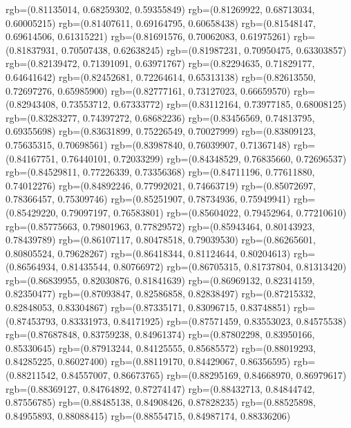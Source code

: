 {{        rgb=(0.81135014, 0.68259302, 0.59355849)
        rgb=(0.81269922, 0.68713034, 0.60005215)
        rgb=(0.81407611, 0.69164795, 0.60658438)
        rgb=(0.81548147, 0.69614506, 0.61315221)
        rgb=(0.81691576, 0.70062083, 0.61975261)
        rgb=(0.81837931, 0.70507438, 0.62638245)
        rgb=(0.81987231, 0.70950475, 0.63303857)
        rgb=(0.82139472, 0.71391091, 0.63971767)
        rgb=(0.82294635, 0.71829177, 0.64641642)
        rgb=(0.82452681, 0.72264614, 0.65313138)
        rgb=(0.82613550, 0.72697276, 0.65985900)
        rgb=(0.82777161, 0.73127023, 0.66659570)
        rgb=(0.82943408, 0.73553712, 0.67333772)
        rgb=(0.83112164, 0.73977185, 0.68008125)
        rgb=(0.83283277, 0.74397272, 0.68682236)
        rgb=(0.83456569, 0.74813795, 0.69355698)
        rgb=(0.83631899, 0.75226549, 0.70027999)
        rgb=(0.83809123, 0.75635315, 0.70698561)
        rgb=(0.83987840, 0.76039907, 0.71367148)
        rgb=(0.84167751, 0.76440101, 0.72033299)
        rgb=(0.84348529, 0.76835660, 0.72696537)
        rgb=(0.84529811, 0.77226339, 0.73356368)
        rgb=(0.84711196, 0.77611880, 0.74012276)
        rgb=(0.84892246, 0.77992021, 0.74663719)
        rgb=(0.85072697, 0.78366457, 0.75309746)
        rgb=(0.85251907, 0.78734936, 0.75949941)
        rgb=(0.85429220, 0.79097197, 0.76583801)
        rgb=(0.85604022, 0.79452964, 0.77210610)
        rgb=(0.85775663, 0.79801963, 0.77829572)
        rgb=(0.85943464, 0.80143923, 0.78439789)
        rgb=(0.86107117, 0.80478518, 0.79039530)
        rgb=(0.86265601, 0.80805524, 0.79628267)
        rgb=(0.86418344, 0.81124644, 0.80204613)
        rgb=(0.86564934, 0.81435544, 0.80766972)
        rgb=(0.86705315, 0.81737804, 0.81313420)
        rgb=(0.86839955, 0.82030876, 0.81841639)
        rgb=(0.86969132, 0.82314159, 0.82350477)
        rgb=(0.87093847, 0.82586858, 0.82838497)
        rgb=(0.87215332, 0.82848053, 0.83304867)
        rgb=(0.87335171, 0.83096715, 0.83748851)
        rgb=(0.87453793, 0.83331973, 0.84171925)
        rgb=(0.87571459, 0.83553023, 0.84575538)
        rgb=(0.87687848, 0.83759238, 0.84961374)
        rgb=(0.87802298, 0.83950166, 0.85330645)
        rgb=(0.87913244, 0.84125555, 0.85685572)
        rgb=(0.88019293, 0.84285225, 0.86027400)
        rgb=(0.88119170, 0.84429067, 0.86356595)
        rgb=(0.88211542, 0.84557007, 0.86673765)
        rgb=(0.88295169, 0.84668970, 0.86979617)
        rgb=(0.88369127, 0.84764892, 0.87274147)
        rgb=(0.88432713, 0.84844742, 0.87556785)
        rgb=(0.88485138, 0.84908426, 0.87828235)
        rgb=(0.88525898, 0.84955893, 0.88088415)
        rgb=(0.88554715, 0.84987174, 0.88336206)
}}
